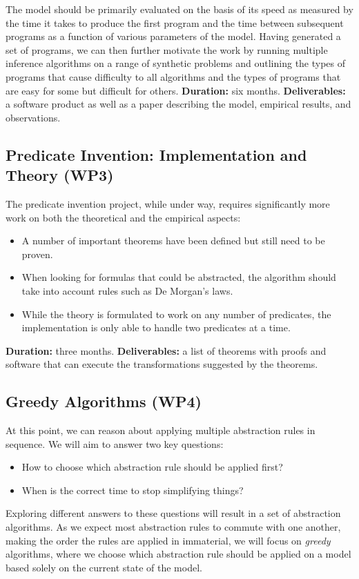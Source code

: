 \documentclass{article}
\begin{document}
The model should be primarily evaluated on the basis of its speed as measured by
the time it takes to produce the first program and the time between subsequent
programs as a function of various parameters of the model. Having generated a
set of programs, we can then further motivate the work by running multiple
inference algorithms on a range of synthetic problems and outlining the types of
programs that cause difficulty to all algorithms and the types of programs that
are easy for some but difficult for others. \textbf{Duration:} six months.
\textbf{Deliverables:} a software product as well as a paper describing the
model, empirical results, and observations.

\subsection{Predicate Invention: Implementation and Theory (WP3)}

The predicate invention project, while under way, requires significantly more
work on both the theoretical and the empirical aspects:
\begin{itemize}
\item A number of important theorems have been defined but still need to be
  proven.
\item When looking for formulas that could be abstracted, the algorithm should
  take into account rules such as De Morgan's laws.
\item While the theory is formulated to work on any number of predicates, the
  implementation is only able to handle two predicates at a time.
\end{itemize}
\textbf{Duration:} three months. \textbf{Deliverables:} a list of theorems with
proofs and software that can execute the transformations suggested by the
theorems.

\subsection{Greedy Algorithms (WP4)}

At this point, we can reason about applying multiple abstraction rules in
sequence. We will aim to answer two key questions:
\begin{itemize}
\item How to choose which abstraction rule should be applied first?
\item When is the correct time to stop simplifying things?
\end{itemize}
Exploring different answers to these questions will result in a set of
abstraction algorithms. As we expect most abstraction rules to commute with one
another, making the order the rules are applied in immaterial, we will focus on
\emph{greedy} algorithms, where we choose which abstraction rule should be
applied on a model based solely on the current state of the model.
\end{document}
